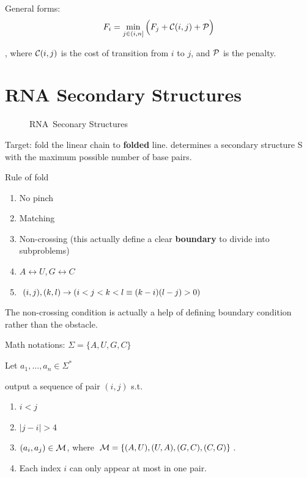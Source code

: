 \documentclass[a4paper]{report}
\theoremstyle{definition}
\begin{document}
General forms:
$$
F_i = \min_{j\in(i,n]}\Big(F_j+\mathcal{C}(i, j)+\mathcal{P}\Big)
$$

, where $\mathcal{C}(i, j)$ is the cost of transition from $i$ to $j$, and $\mathcal{P}$ is the penalty.

\section{RNA Secondary Structures}
\begin{figure}[!htp]
\centering
{}
\caption{RNA\ Seconary Structures}
\label{fig:rna}
\end{figure}

Target: fold the linear chain to \textbf{folded} line. determines a secondary structure S with the maximum possible number of base pairs.

Rule of fold
\begin{enumerate}
\item No pinch
\item Matching
\item Non-crossing (this actually define a clear \textbf{boundary} to divide into subproblems)
\item $A \leftrightarrow U, G \leftrightarrow C$
\item $(i, j), (k,l) \rightarrow (i<j<k<l \equiv (k-i)(l-j)>0)$
\end{enumerate}
The non-crossing condition is actually a help of defining boundary condition rather than the obstacle.

Math notations:
$\Sigma=\{A, U, G, C\}$

Let $a_1, ..., a_n\in \Sigma^*$

output a sequence of pair $(i, j)$ s.t.
\begin{enumerate}
\item $i<j$
\item $|j-i| > 4$
\item $(a_i, a_j)\in \mathcal{M}$, where $\mathcal{M}= \{(A, U), (U, A), (G, C), (C, G)\}$.
\item Each index $i$ can only appear at most in one pair.
\end{enumerate}
\end{document}
